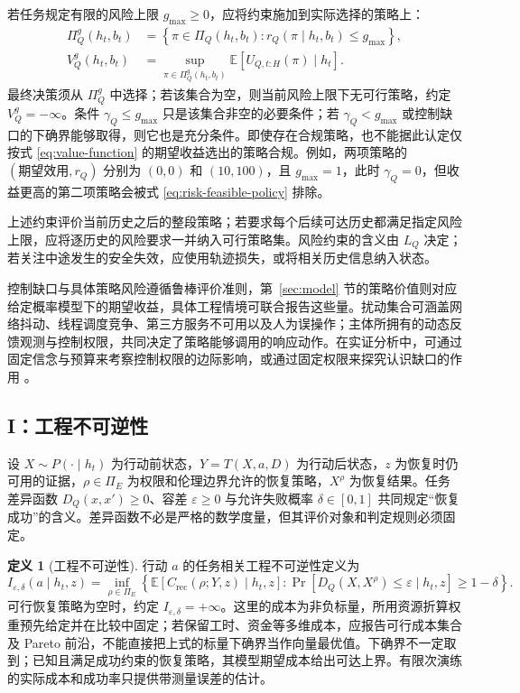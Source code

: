 \documentclass[11pt,a4paper]{ctexart}
\numberwithin{equation}{section}
\theoremstyle{definition}
\newtheorem{definition}{定义}[section]
\theoremstyle{plain}
\begin{document}
若任务规定有限的风险上限 $g_{\max}\ge0$，应将约束施加到实际选择的策略上：
\begin{align}
\Pi_Q^g(h_t,b_t)
&=\left\{\pi\in\Pi_Q(h_t,b_t):
r_Q(\pi\mid h_t,b_t)\le g_{\max}\right\},
\label{eq:risk-feasible-policy}\\
V_Q^g(h_t,b_t)
&=\sup_{\pi\in\Pi_Q^g(h_t,b_t)}
\mathbb E[U_{Q,t:H}(\pi)\mid h_t].
\label{eq:risk-value-function}
\end{align}
最终决策须从 $\Pi_Q^g$ 中选择；若该集合为空，则当前风险上限下无可行策略，约定 $V_Q^g=-\infty$。条件 $\gamma_Q\le g_{\max}$ 只是该集合非空的必要条件；若 $\gamma_Q<g_{\max}$ 或控制缺口的下确界能够取得，则它也是充分条件。即使存在合规策略，也不能据此认定仅按式 \eqref{eq:value-function} 的期望收益选出的策略合规。例如，两项策略的 $(\text{期望效用},r_Q)$ 分别为 $(0,0)$ 和 $(10,100)$，且 $g_{\max}=1$，此时 $\gamma_Q=0$，但收益更高的第二项策略会被式 \eqref{eq:risk-feasible-policy} 排除。

上述约束评价当前历史之后的整段策略；若要求每个后续可达历史都满足指定风险上限，应将逐历史的风险要求一并纳入可行策略集。风险约束的含义由 $L_Q$ 决定；若关注中途发生的安全失效，应使用轨迹损失，或将相关历史信息纳入状态。

控制缺口与具体策略风险遵循鲁棒评价准则，第~\ref{sec:model} 节的策略价值则对应给定概率模型下的期望收益，具体工程情境可联合报告这些量。扰动集合可涵盖网络抖动、线程调度竞争、第三方服务不可用以及人为误操作；主体所拥有的动态反馈观测与控制权限，共同决定了策略能够调用的响应动作。在实证分析中，可通过固定信念与预算来考察控制权限的边际影响，或通过固定权限来探究认识缺口的作用 \cite{ashby1956,skogestad2005}。

\subsection{I：工程不可逆性}

设 $X\sim P(\cdot\mid h_t)$ 为行动前状态，$Y=T(X,a,D)$ 为行动后状态，$z$ 为恢复时仍可用的证据，$\rho\in\Pi_E$ 为权限和伦理边界允许的恢复策略，$X^\rho$ 为恢复结果。任务差异函数 $D_Q(x,x')\ge0$、容差 $\varepsilon\ge0$ 与允许失败概率 $\delta\in[0,1]$ 共同规定“恢复成功”的含义。差异函数不必是严格的数学度量，但其评价对象和判定规则必须固定。

\begin{definition}[工程不可逆性]
行动 $a$ 的任务相关工程不可逆性定义为
\begin{equation}
I_{\varepsilon,\delta}(a\mid h_t,z)
=\inf_{\rho\in\Pi_E}
\left\{\mathbb E[C_{\mathrm{rec}}(\rho;Y,z)\mid h_t,z]:
\Pr[D_Q(X,X^\rho)\le\varepsilon\mid h_t,z]\ge1-\delta\right\}.
\label{eq:irreversibility}
\end{equation}
可行恢复策略为空时，约定 $I_{\varepsilon,\delta}=+\infty$。这里的成本为非负标量，所用资源折算权重预先给定并在比较中固定；若保留工时、资金等多维成本，应报告可行成本集合及 Pareto 前沿，不能直接把上式的标量下确界当作向量最优值。下确界不一定取到；已知且满足成功约束的恢复策略，其模型期望成本给出可达上界。有限次演练的实际成本和成功率只提供带测量误差的估计。
\end{definition}
\end{document}
